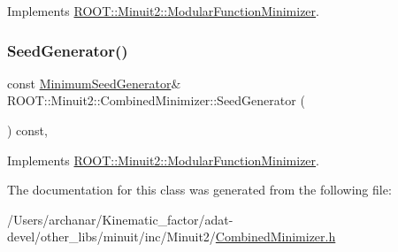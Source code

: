 Implements \mbox{\hyperlink{classROOT_1_1Minuit2_1_1ModularFunctionMinimizer_a742930de97b0ce9ba23773874ae0894b}{R\+O\+O\+T\+::\+Minuit2\+::\+Modular\+Function\+Minimizer}}.

\mbox{\label{classROOT_1_1Minuit2_1_1CombinedMinimizer_a667ce6c321b6948d37087a2ac06be58c}} 
\subsubsection{\texorpdfstring{SeedGenerator()}{SeedGenerator()}\hspace{0.1cm}{\footnotesize\ttfamily [3/3]}}
{\footnotesize\ttfamily const \mbox{\hyperlink{classROOT_1_1Minuit2_1_1MinimumSeedGenerator}{Minimum\+Seed\+Generator}}\& R\+O\+O\+T\+::\+Minuit2\+::\+Combined\+Minimizer\+::\+Seed\+Generator (\begin{DoxyParamCaption}{ }\end{DoxyParamCaption}) const\hspace{0.3cm}{\ttfamily [inline]}, {\ttfamily [virtual]}}



Implements \mbox{\hyperlink{classROOT_1_1Minuit2_1_1ModularFunctionMinimizer_a742930de97b0ce9ba23773874ae0894b}{R\+O\+O\+T\+::\+Minuit2\+::\+Modular\+Function\+Minimizer}}.



The documentation for this class was generated from the following file\+:\begin{DoxyCompactItemize}
\item 
/\+Users/archanar/\+Kinematic\+\_\+factor/adat-\/devel/other\+\_\+libs/minuit/inc/\+Minuit2/\mbox{\hyperlink{adat-devel_2other__libs_2minuit_2inc_2Minuit2_2CombinedMinimizer_8h}{Combined\+Minimizer.\+h}}\end{DoxyCompactItemize}
